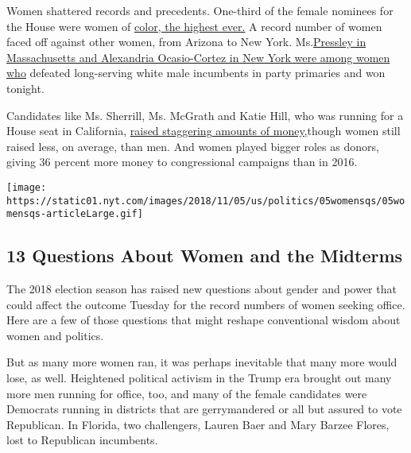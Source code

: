 Women shattered records and precedents. One-third of the female nominees
for the House were women of
\href{https://www.nytimes.com/interactive/2018/10/31/us/politics/midterm-election-candidates-diversity.html}{color,
the highest ever.} A record number of women faced off against other
women, from Arizona to New York.
Ms.\href{https://www.nytimes.com/2018/06/29/us/politics/is-this-the-year-women-break-the-rules-and-win.html?fbclid=IwAR3snD-ieWNMXl2mKlTKc7S_78NE3pbQrqIQMhBEnnz5ACZmDXJN9MneQmI}{Pressley
in Massachusetts and Alexandria Ocasio-Cortez in New York were among
women who} defeated long-serving white male incumbents in party
primaries and won tonight.

Candidates like Ms. Sherrill, Ms. McGrath and Katie Hill, who was
running for a House seat in California,
\href{https://www.nytimes.com/2018/10/30/us/politics/women-campaign-fundraising.html?fbclid=IwAR2Cnvn7eUTjYOx9Yi-l6FvFDAyjNZuzFH-VAq6CtMtdhWHkmL8_QCnCOE8}{raised
staggering amounts of money,}though women still raised less, on average,
than men. And women played bigger roles as donors, giving 36 percent
more money to congressional campaigns than in 2016.

\href{https://www.nytimes.com/interactive/2018/11/06/us/politics/questions-about-women-midterms.html}{}

\texttt{[image: https://static01.nyt.com/images/2018/11/05/us/politics/05womensqs/05womensqs-articleLarge.gif]}

\hypertarget{13-questions-about-women-and-the-midterms}{%
\subsection{13 Questions About Women and the
Midterms}\label{13-questions-about-women-and-the-midterms}}

The 2018 election season has raised new questions about gender and power
that could affect the outcome Tuesday for the record numbers of women
seeking office. Here are a few of those questions that might reshape
conventional wisdom about women and politics.

But as many more women ran, it was perhaps inevitable that many more
would lose, as well. Heightened political activism in the Trump era
brought out many more men running for office, too, and many of the
female candidates were Democrats running in districts that are
gerrymandered or all but assured to vote Republican. In Florida, two
challengers, Lauren Baer and Mary Barzee Flores, lost to Republican
incumbents.

